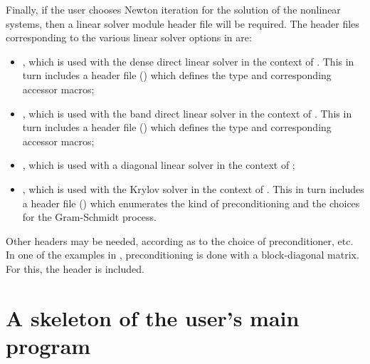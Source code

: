Finally, if the user chooses Newton iteration for the solution of the nonlinear
systems, then a linear solver module header file will be required. 
The header files corresponding to the various linear solver options in
{\cvode} are:
\begin{itemize}
\item {}, 
  which is used with the dense direct linear solver in 
  the context of {\cvode}. This in turn includes a header file ()
  which defines the  type and corresponding accessor macros; 
\item {}, 
  which is used with the band direct linear solver in the
  context of {\cvode}. This in turn includes a header file ()
  which defines the  type and corresponding accessor macros;
\item {}, which is used with a diagonal linear solver in the
  context of {\cvode};
\item {}, 
  which is used with the Krylov solver {\spgmr} in the
  context of {\cvode}. This in turn includes a header file ()
  which enumerates the kind of preconditioning and the choices for the
  Gram-Schmidt process.
\end{itemize}

Other headers may be needed, according as to the choice of preconditioner,
etc. In one of the examples in \cite{cvode2.2.0_ex}, preconditioning is done
with a block-diagonal matrix. For this, the header
 is included.

\section{A skeleton of the user's main program}\label{ss:skeleton_sim}


